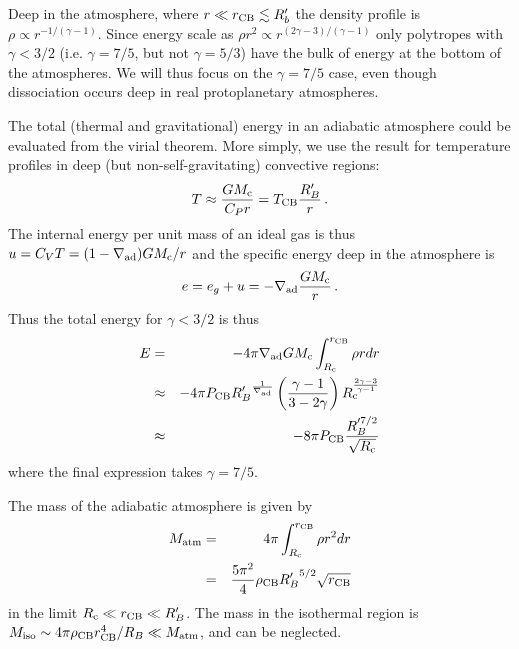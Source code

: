 \documentclass[12pt, preprint,numberedappendix]{emulateapj}
\newcommand{\delad}{\nabla_{\rm ad}}
\newcommand{\Rg}{\mathcal{R}}
\newcommand{\co}{_{\rm c}}
\newcommand{\di}{_{\rm o}}
\newcommand{\cb}{_{\rm CB}}
\begin{document}
  Deep in the atmosphere, where $r \ll r\cb \lesssim R_b'$ the density profile is $\rho \propto r^{-1/(\gamma -1)}$.  Since energy scale as $\rho r^2 \propto r^{(2\gamma -3)/(\gamma - 1)}$ only polytropes with $\gamma < 3/2$ (i.e. $\gamma = 7/5$, but not $\gamma = 5/3$) have the bulk of energy at the bottom of the atmospheres.  We will thus focus on the $\gamma = 7/5$ case, even though dissociation occurs deep in real protoplanetary atmospheres.

The total (thermal and gravitational) energy in an adiabatic atmosphere could be evaluated from the virial theorem.  More simply, we use the result for temperature profiles in deep (but non-self-gravitating) convective regions:
\begin{equation}
T \approx {G M\co \over C_P r} = T\cb {R_B' \over r}\, .
\end{equation} 
The internal energy per unit mass of an ideal gas is thus $u = C_V T = (1 - \delad) G M\co/r$ and the specific energy  deep in the atmosphere is
\begin{equation}
e = e_g + u = -\delad {GM\co \over r} \, .
\end{equation} 
Thus the total energy for $\gamma < 3/2$ is thus
\begin{eqnarray} 
E &=& - 4 \pi \nabla_{\rm ad} G M\co \int_{R\co}^{r\cb} \rho r dr \\
&\approx& - 4 \pi P\cb {R_B'}^{1 \over \nabla_{\rm ad}} \left(\gamma-1 \over 3 - 2 \gamma\right)  R\co^{2\gamma-3\over \gamma-1}  \\
&\approx& - 8 \pi P\cb {R_B'^{7/2} \over \sqrt{R\co}}
\end{eqnarray} 
where the final expression takes $\gamma = 7/5$. %

The mass of the adiabatic atmosphere is given by
\begin{eqnarray} 
M_{\rm atm} &=& 4 \pi \int_{R\co}^{r\cb} \rho r^2 dr \\
&=& {5 \pi^2 \over 4} \rho\cb {R_B'}^{5/2} \sqrt{r\cb} %
\end{eqnarray}
in the limit $R\co \ll r\cb \ll R_B'$. The mass in the isothermal region is $M_{\rm iso} \sim 4 \pi \rho\cb r\cb^4/R_B \ll M_{\rm atm}$, and can be neglected.
\end{document}
